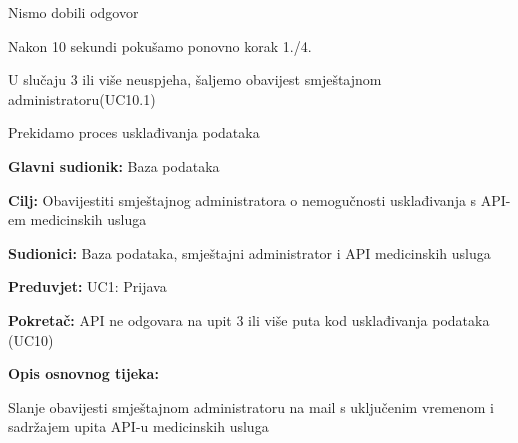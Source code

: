 \begin{packed_item}
\begin{packed_item}
\begin{packed_enum}
							\end{packed_enum}
							
							\item[2.a i 5.a] Nismo dobili odgovor 
							\item[] \begin{packed_enum}
								
								\item Nakon 10 sekundi pokušamo ponovno korak 1./4.
								\item U slučaju 3 ili više neuspjeha, šaljemo obavijest smještajnom administratoru(UC10.1)
								\item Prekidamo proces usklađivanja podataka
								
							\end{packed_enum}
							
						\end{packed_item}
					\end{packed_item}
					
					\noindent {}
					\begin{packed_item}
						
						\item \textbf{Glavni sudionik: } Baza podataka
						\item  \textbf{Cilj:} Obavijestiti smještajnog administratora o nemogučnosti usklađivanja s API-em medicinskih usluga
						\item  \textbf{Sudionici:} Baza podataka, smještajni administrator i API medicinskih usluga
						\item  \textbf{Preduvjet:} UC1: Prijava
						\item \textbf{Pokretač: } API ne odgovara na upit 3 ili više puta kod usklađivanja podataka (UC10)
						\item  \textbf{Opis osnovnog tijeka:}
						
						\item[] \begin{packed_enum}
							
							\item Slanje obavijesti smještajnom administratoru na mail s uključenim vremenom i sadržajem upita API-u medicinskih usluga
						\end{packed_enum}
					\end{packed_item}
					
